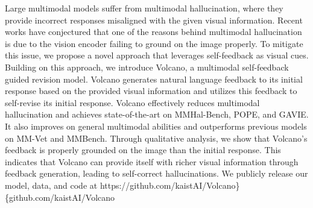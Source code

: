 Large multimodal models suffer from multimodal hallucination, where they provide incorrect responses misaligned with the given visual information. Recent works have conjectured that one of the reasons behind multimodal hallucination is due to the vision encoder failing to ground on the image properly. To mitigate this issue, we propose a novel approach that leverages self-feedback as visual cues. Building on this approach, we introduce Volcano, a multimodal self-feedback guided revision model. Volcano generates natural language feedback to its initial response based on the provided visual information and utilizes this feedback to self-revise its initial response. Volcano effectively reduces multimodal hallucination and achieves state-of-the-art on MMHal-Bench, POPE, and GAVIE. It also improves on general multimodal abilities and outperforms previous models on MM-Vet and MMBench. Through qualitative analysis, we show that Volcano's feedback is properly grounded on the image than the initial response. This indicates that Volcano can provide itself with richer visual information through feedback generation, leading to self-correct hallucinations. We publicly release our model, data, and code at https://github.com/kaistAI/Volcano\}\{github.com/kaistAI/Volcano